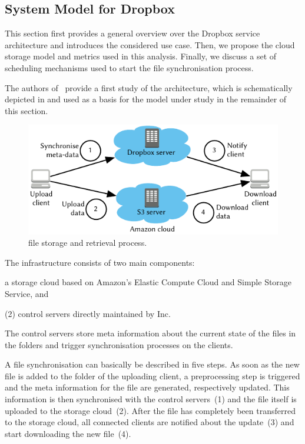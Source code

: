 \subsection{System Model for Dropbox}\label{sec:application:cloud_file_synchronisation:system_model}
This section first provides a general overview over the Dropbox service architecture and introduces the considered use case.
Then, we propose the cloud storage model and metrics used in this analysis.
Finally, we discuss a set of scheduling mechanisms used to start the file synchronisation process. 

The authors of~\cite{Drago2012} provide a first study of the \dropbox architecture, which is schematically depicted in  and used as a basis for the model under study in the remainder of this section.

\begin{figure}
  \centering
  \includegraphics[width=\columnwidth]{application/cloud_file_synchronization/system_model/figures/dropbox_architecture}
  \caption{\dropbox file storage and retrieval process.}
  \label{fig:application:cloud_file_synchronisation:system_model:dropbox_architecture}
\end{figure}

The \dropbox infrastructure consists of two main components:
\begin{enumerate*}
\item a storage cloud based on Amazon's Elastic Compute Cloud and Simple Storage Service, and 
\item (2) control servers directly maintained by \dropbox Inc. 
\end{enumerate*}
The control servers store meta information about the current state of the files in the \dropbox folders and trigger synchronisation processes on the clients.

A file synchronisation can basically be described in five steps.
As soon as the new file is added to the \dropbox folder of the uploading client, a preprocessing step is triggered and the meta information for the file are generated, respectively updated.
This information is then synchronised with the control servers~(1) and the file itself is uploaded to the storage cloud~(2).
After the file has completely been transferred to the storage cloud, all connected clients are notified about the update~(3) and start downloading the new file~(4).

